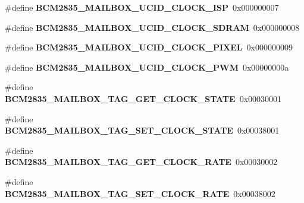 \begin{DoxyCompactItemize}
\#define {\bfseries B\+C\+M2835\+\_\+\+M\+A\+I\+L\+B\+O\+X\+\_\+\+U\+C\+I\+D\+\_\+\+C\+L\+O\+C\+K\+\_\+\+I\+SP}~0x000000007
\item 
\mbox{\label{group__raspberrypi__vc_gaeabfd717eced1684f7d433637aa4ee39}} 
\#define {\bfseries B\+C\+M2835\+\_\+\+M\+A\+I\+L\+B\+O\+X\+\_\+\+U\+C\+I\+D\+\_\+\+C\+L\+O\+C\+K\+\_\+\+S\+D\+R\+AM}~0x000000008
\item 
\mbox{\label{group__raspberrypi__vc_gae64edb796c03dae838fdbe74b85cb69e}} 
\#define {\bfseries B\+C\+M2835\+\_\+\+M\+A\+I\+L\+B\+O\+X\+\_\+\+U\+C\+I\+D\+\_\+\+C\+L\+O\+C\+K\+\_\+\+P\+I\+X\+EL}~0x000000009
\item 
\mbox{\label{group__raspberrypi__vc_ga5823a6f096b5c8d4b79ab43112be79ef}} 
\#define {\bfseries B\+C\+M2835\+\_\+\+M\+A\+I\+L\+B\+O\+X\+\_\+\+U\+C\+I\+D\+\_\+\+C\+L\+O\+C\+K\+\_\+\+P\+WM}~0x00000000a
\item 
\mbox{\label{group__raspberrypi__vc_ga186f9295ad878205da75bda60302c097}} 
\#define {\bfseries B\+C\+M2835\+\_\+\+M\+A\+I\+L\+B\+O\+X\+\_\+\+T\+A\+G\+\_\+\+G\+E\+T\+\_\+\+C\+L\+O\+C\+K\+\_\+\+S\+T\+A\+TE}~0x00030001
\item 
\mbox{\label{group__raspberrypi__vc_ga0bf4ada9a705bb15f53eaab6f1748721}} 
\#define {\bfseries B\+C\+M2835\+\_\+\+M\+A\+I\+L\+B\+O\+X\+\_\+\+T\+A\+G\+\_\+\+S\+E\+T\+\_\+\+C\+L\+O\+C\+K\+\_\+\+S\+T\+A\+TE}~0x00038001
\item 
\mbox{\label{group__raspberrypi__vc_ga82624a4c29436d1be1addb5e650f101d}} 
\#define {\bfseries B\+C\+M2835\+\_\+\+M\+A\+I\+L\+B\+O\+X\+\_\+\+T\+A\+G\+\_\+\+G\+E\+T\+\_\+\+C\+L\+O\+C\+K\+\_\+\+R\+A\+TE}~0x00030002
\item 
\mbox{\label{group__raspberrypi__vc_ga06188430ed6897da04055a05e4032d71}} 
\#define {\bfseries B\+C\+M2835\+\_\+\+M\+A\+I\+L\+B\+O\+X\+\_\+\+T\+A\+G\+\_\+\+S\+E\+T\+\_\+\+C\+L\+O\+C\+K\+\_\+\+R\+A\+TE}~0x00038002
\item 
\mbox{\label{group__raspberrypi__vc_ga906c5610a133867adb3154f2626bff0f}} 

\end{DoxyCompactItemize}

